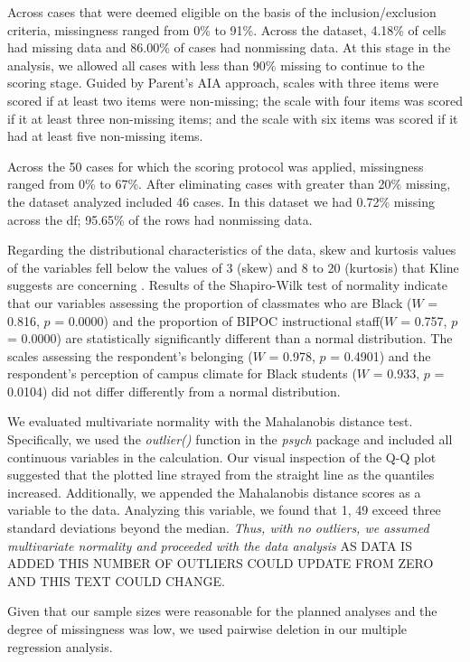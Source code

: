 \documentclass[
]{book}
\begin{document}
Across cases that were deemed eligible on the basis of the inclusion/exclusion criteria, missingness ranged from 0\% to 91\%. Across the dataset, 4.18\% of cells had missing data and 86.00\% of cases had nonmissing data. At this stage in the analysis, we allowed all cases with less than 90\% missing to continue to the scoring stage. Guided by Parent's \citeyearpar{parent_handling_2013} AIA approach, scales with three items were scored if at least two items were non-missing; the scale with four items was scored if it at least three non-missing items; and the scale with six items was scored if it had at least five non-missing items.

Across the 50 cases for which the scoring protocol was applied, missingness ranged from 0\% to 67\%. After eliminating cases with greater than 20\% missing, the dataset analyzed included 46 cases. In this dataset we had 0.72\% missing across the df; 95.65\% of the rows had nonmissing data.

Regarding the distributional characteristics of the data, skew and kurtosis values of the variables fell below the values of 3 (skew) and 8 to 20 (kurtosis) that Kline suggests are concerning \citeyearpar{kline_principles_2016}. Results of the Shapiro-Wilk test of normality indicate that our variables assessing the proportion of classmates who are Black (\(W\) = 0.816, \(p\) = 0.0000) and the proportion of BIPOC instructional staff(\(W\) = 0.757, \(p\) = 0.0000) are statistically significantly different than a normal distribution. The scales assessing the respondent's belonging (\(W\) = 0.978, \(p\) = 0.4901) and the respondent's perception of campus climate for Black students (\(W\) = 0.933, \(p\) = 0.0104) did not differ differently from a normal distribution.

We evaluated multivariate normality with the Mahalanobis distance test. Specifically, we used the \emph{outlier()} function in the \emph{psych} package and included all continuous variables in the calculation. Our visual inspection of the Q-Q plot suggested that the plotted line strayed from the straight line as the quantiles increased. Additionally, we appended the Mahalanobis distance scores as a variable to the data. Analyzing this variable, we found that 1, 49 exceed three standard deviations beyond the median. \emph{Thus, with no outliers, we assumed multivariate normality and proceeded with the data analysis} AS DATA IS ADDED THIS NUMBER OF OUTLIERS COULD UPDATE FROM ZERO AND THIS TEXT COULD CHANGE.

Given that our sample sizes were reasonable for the planned analyses and the degree of missingness was low, we used pairwise deletion in our multiple regression analysis.
\end{document}
